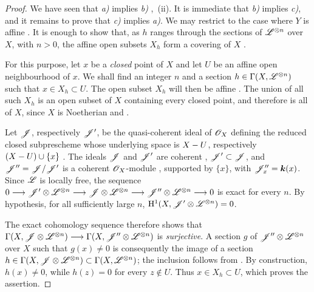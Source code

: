\begin{proof}
We have seen that \emph{a)} implies \emph{b)} ,~(ii).
It is immediate that \emph{b)} implies \emph{c)}, and it remains to prove
that \emph{c)} implies \emph{a)}.
We may restrict to the case where $Y$ is affine .
It is enough to show that, as $h$ ranges through the sections of
$\mathscr{L}^{\otimes n}$ over $X$, with $n>0$, the affine open subsets $X_h$
form a covering of $X$ .

For this purpose, let $x$ be a \emph{closed} point of $X$ and let $U$ be an
affine open neighbourhood of $x$.
We shall find an integer $n$ and a section $h\in\Gamma(X,\mathscr{L}^{\otimes n})$
such that $x\in X_h\subset U$.
The open subset $X_h$ will then be affine .
The union of all such $X_h$ is an open subset of $X$ containing every
closed point, and therefore is all of $X$, since $X$ is Noetherian
 and .

Let $\mathscr{J}$, respectively $\mathscr{J}'$, be the quasi-coherent ideal of
$\mathscr{O}_X$ defining the reduced closed subprescheme whose underlying
space is $X- U$, respectively $(X- U)\cup\{x\}$ .
The ideals $\mathscr{J}$ and $\mathscr{J}'$ are coherent ,
$\mathscr{J}'\subset\mathscr{J}$, and $\mathscr{J}''=\mathscr{J}/\mathscr{J}'$
is a coherent $\mathscr{O}_X$-module , supported by
$\{x\}$, with $\mathscr{J}''_x=\boldsymbol{k}(x)$.
Since $\mathscr{L}$ is locally free, the sequence $0\longrightarrow
\mathscr{J}'\otimes\mathscr{L}^{\otimes n}
\longrightarrow
\mathscr{J}\otimes\mathscr{L}^{\otimes n}
\longrightarrow
\mathscr{J}''\otimes\mathscr{L}^{\otimes n}
\longrightarrow0$
is exact for every $n$.
By hypothesis, for all sufficiently large $n$, $\mathrm{H}^1(X,\mathscr{J}'\otimes\mathscr{L}^{\otimes n})=0$.


The exact cohomology sequence therefore shows that $\Gamma(X,\mathscr{J}\otimes\mathscr{L}^{\otimes n})
\longrightarrow
\Gamma(X,\mathscr{J}''\otimes\mathscr{L}^{\otimes n})$
is \emph{surjective}.
A section $g$ of $\mathscr{J}''\otimes\mathscr{L}^{\otimes n}$ over $X$ such that
$g(x)\neq0$ is consequently the image of a section $h\in\Gamma(X,\mathscr{J}\otimes\mathscr{L}^{\otimes n})
\subset\Gamma(X,\mathscr{L}^{\otimes n})$;
the inclusion follows from .
By construction, $h(x)\neq0$, while $h(z)=0$ for every $z\notin U$.
Thus $x\in X_h\subset U$, which proves the assertion.
\end{proof}

